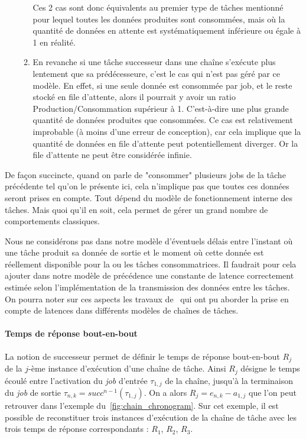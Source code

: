 \documentclass[french, a4paper, 11pt, twoside, pdftex]{StyleThese}
\begin{document}
\begin{itemize}
\begin{enumerate}
		Ces 2 cas sont donc équivalents au premier type de tâches mentionné pour lequel toutes les données produites sont consommées, mais où la quantité de données en attente est systématiquement inférieure ou égale à 1 en réalité.
		\item En revanche si une tâche successeur dans une chaîne s'exécute plus lentement que sa prédécesseure, c'est le cas qui n'est pas géré par ce modèle. En effet, si une seule donnée est consommée par job, et le reste stocké en file d'attente, alors il pourrait y avoir un ratio Production/Consommation supérieur à 1. C'est-à-dire une plus grande quantité de données produites que consommées. Ce cas est relativement improbable (à moins d'une erreur de conception), car cela implique que la quantité de données en file d'attente peut potentiellement diverger. Or la file d'attente ne peut être considérée infinie.\end{enumerate}  
	\end{itemize}
  		De façon succincte, quand on parle de "consommer" plusieurs jobs de la tâche précédente tel qu'on le présente ici, cela n'implique pas que toutes ces données seront prises en compte. Tout dépend du modèle de fonctionnement interne des tâches. Mais quoi qu'il en soit, cela permet de gérer un grand nombre de comportements classiques.
  		
  		Nous ne considérons pas dans notre modèle d'éventuels délais entre l'instant où une tâche produit sa donnée de sortie et le moment où cette donnée est réellement disponible pour la ou les tâches consommatrices. Il faudrait pour cela ajouter dans notre modèle de précédence une constante de latence correctement estimée selon l'implémentation de la transmission des données entre les tâches. On pourra noter sur ces aspects les travaux de~\cite{friese_estimating_2018} qui ont pu aborder la prise en compte de latences dans différents modèles de chaînes de tâches.


        \paragraph{Temps de réponse bout-en-bout}

    La notion de successeur permet de définir le temps de réponse bout-en-bout $R_j$ de la $ j $-ème instance d'exécution d'une chaîne de tâche. Ainsi $R_j$ désigne le temps écoulé entre l'activation du \textit{job} d'entrée $\tau_{1,j}$ de la chaîne, jusqu'à la terminaison du \textit{job} de sortie $\tau_{n, k} = succ^{n-1}(\tau_{1,j})$.
    On a alors $R_{j} = e_{n,k} - a_{1,j}$ que l'on peut retrouver dans l'exemple du~\autoref{fig:chain_chronogram}. Sur cet exemple, il est possible de reconstituer trois instances d'exécution de la chaîne de tâche avec les trois temps de réponse correspondants : $R_1$, $R_2$, $R_3$. 
    
\end{document}
